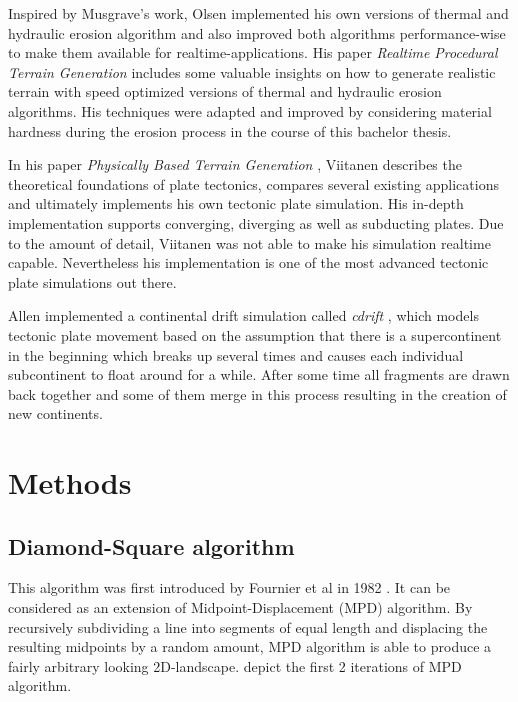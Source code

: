 \documentclass[11pt,a4paper,twoside,openright]{report}
\begin{document}
Inspired by Musgrave's work, Olsen implemented his own versions of thermal and hydraulic erosion algorithm and also improved both algorithms performance-wise to make them available for realtime-applications. His paper \emph{Realtime Procedural Terrain Generation} \cite{Olsen:2004} includes some valuable insights on how to generate realistic terrain with speed optimized versions of thermal and hydraulic erosion algorithms. His techniques were adapted and improved by considering material hardness during the erosion process in the course of this bachelor thesis.

In his paper \emph{Physically Based Terrain Generation} \cite{Viitanen:2012}, Viitanen describes the theoretical foundations of plate tectonics, compares several existing applications and ultimately implements his own tectonic plate simulation. His in-depth implementation supports converging, diverging as well as subducting plates. Due to the amount of detail, Viitanen was not able to make his simulation realtime capable. Nevertheless his implementation is one of the most advanced tectonic plate simulations out there.

Allen implemented a continental drift simulation called \emph{cdrift} \cite{Allen:1991}, which models tectonic plate movement based on the assumption that there is a supercontinent in the beginning which breaks up several times and causes each individual subcontinent to float around for a while. After some time all fragments are drawn back together and some of them merge in this process resulting in the creation of new continents.
\chapter{Methods}
\label{sec:methods}

\section{Diamond-Square algorithm}
This algorithm was first introduced by Fournier et al in 1982 \cite{Fournier:1982:CRS:358523.358553}. It can be considered as an extension of Midpoint-Displacement (MPD) algorithm. By recursively subdividing a line into segments of equal length and displacing the resulting midpoints by a random amount, MPD algorithm is able to produce a fairly arbitrary looking 2D-landscape.  depict the first 2 iterations of MPD algorithm.
\end{document}
